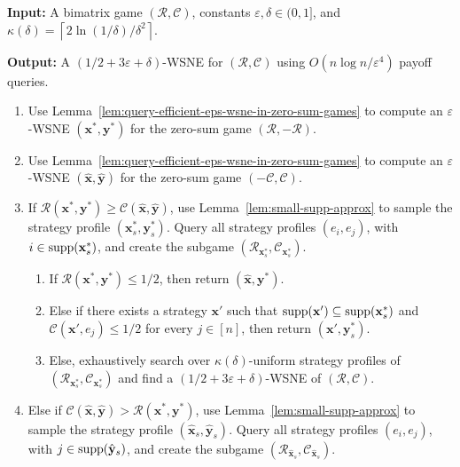 \begin{algorithm}[H]
  \caption{Query-Efficient Implementation of Algorithm~\ref{alg:full-information}}
  \label{alg:query-efficient}
  \footnotesize
  \textbf{Input:} A bimatrix game \((\mathcal{R},\mathcal{C})\), constants
  \(\varepsilon,\delta\in(0,1]\), and
  \(\kappa(\delta)=\left\lceil 2\ln(1/\delta)/\delta^2\right\rceil\).\par
  \textbf{Output:} A \((1/2+3\varepsilon+\delta)\)-WSNE for
  \((\mathcal{R},\mathcal{C})\) using
  \(O(n\log n/\varepsilon^4)\) payoff queries.
  \begin{enumerate}[label=\arabic*.,leftmargin=1.8em,itemsep=0.18em,topsep=0.3em]
    \item Use Lemma~\ref{lem:query-efficient-eps-wsne-in-zero-sum-games} to compute an \(\varepsilon\)-WSNE \((\mathbf{x}^*,\mathbf{y}^*)\) for the zero-sum game \((\mathcal{R},-\mathcal{R})\).
    \item Use Lemma~\ref{lem:query-efficient-eps-wsne-in-zero-sum-games} to compute an \(\varepsilon\)-WSNE \((\hat{\mathbf{x}},\hat{\mathbf{y}})\) for the zero-sum game \((-\mathcal{C},\mathcal{C})\).
    \item If \(\mathcal{R}(\mathbf{x}^*,\mathbf{y}^*)\geq \mathcal{C}(\hat{\mathbf{x}},\hat{\mathbf{y}})\), use Lemma~\ref{lem:small-supp-approx} to sample the strategy profile \((\mathbf{x}_s^*,\mathbf{y}_s^*)\). Query all strategy profiles \((e_i,e_j)\), with \(i\in\operatorname{supp}(\mathbf{x}_s^*)\), and create the subgame \((\mathcal{R}_{\mathbf{x}_s^*},\mathcal{C}_{\mathbf{x}_s^*})\).
      \begin{enumerate}[label=(\alph*),leftmargin=2.2em,itemsep=0.1em,topsep=0.1em]
        \item If \(\mathcal{R}(\mathbf{x}^*,\mathbf{y}^*)\leq 1/2\), then return \((\hat{\mathbf{x}},\mathbf{y}^*)\).
        \item Else if there exists a strategy \(\mathbf{x}'\) such that
        \(\operatorname{supp}(\mathbf{x}')\subseteq\operatorname{supp}(\mathbf{x}_s^*)\) and
        \(\mathcal{C}(\mathbf{x}',e_j)\leq 1/2\) for every \(j\in[n]\), then return \((\mathbf{x}',\mathbf{y}_s^*)\).
        \item Else, exhaustively search over \(\kappa(\delta)\)-uniform strategy profiles of \((\mathcal{R}_{\mathbf{x}_s^*},\mathcal{C}_{\mathbf{x}_s^*})\) and find a \((1/2+3\varepsilon+\delta)\)-WSNE of \((\mathcal{R},\mathcal{C})\).
      \end{enumerate}
    \item Else if \(\mathcal{C}(\hat{\mathbf{x}},\hat{\mathbf{y}})>\mathcal{R}(\mathbf{x}^*,\mathbf{y}^*)\), use Lemma~\ref{lem:small-supp-approx} to sample the strategy profile \((\hat{\mathbf{x}}_s,\hat{\mathbf{y}}_s)\). Query all strategy profiles \((e_i,e_j)\), with \(j\in\operatorname{supp}(\hat{\mathbf{y}}_s)\), and create the subgame \((\mathcal{R}_{\hat{\mathbf{x}}_s},\mathcal{C}_{\hat{\mathbf{x}}_s})\).

\end{enumerate}
\end{algorithm}
